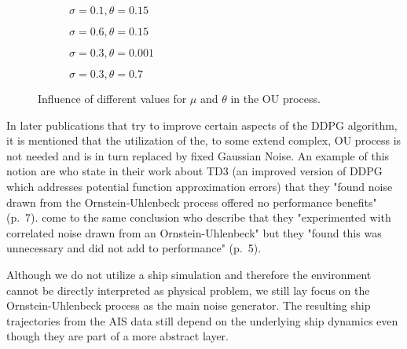 \begin{figure}[H]
    \begin{subfigure}{0.495\textwidth}
      \centering
        
      \caption{$\sigma = 0.1, \theta = 0.15$}
      \label{fig:sub-first}
    \end{subfigure}
    \begin{subfigure}{0.495\textwidth}
      \centering
        
      \caption{$\sigma = 0.6, \theta = 0.15$}
      \label{fig:sub-first}
    \end{subfigure}

\medskip %
    \begin{subfigure}{0.495\textwidth}
      \centering
        
      \caption{$\sigma = 0.3, \theta = 0.001$}
      \label{fig:sub-first}
    \end{subfigure}
    \begin{subfigure}{0.495\textwidth}
      \centering
        
      \caption{$\sigma = 0.3, \theta = 0.7$}
      \label{fig:sub-first}
    \end{subfigure}
\caption{Influence of different values for $\mu$ and $\theta$ in the OU process.}
\label{fig:roc}
\end{figure}

\par
In later publications that try to improve certain aspects of the DDPG algorithm, it is mentioned that the utilization of the, to some extend complex, OU process is not needed and is in turn replaced by fixed Gaussian Noise. An example of this notion are \cite{fujimoto2018addressing} who state in their work about TD3 (an improved version of DDPG which addresses potential function approximation errors) that they "found noise drawn from the Ornstein-Uhlenbeck process offered no performance benefits" (p.~7). \cite{barth2018distributed} come to the same conclusion who describe that they "experimented with correlated noise drawn from an Ornstein-Uhlenbeck" but they "found this was unnecessary and did
not add to performance" (p.~5).
\par
Although we do not utilize a ship simulation and therefore the environment cannot be directly interpreted as physical problem, we still lay focus on the Ornstein-Uhlenbeck process as the main noise generator. The resulting ship trajectories from the AIS data still depend on the underlying ship dynamics even though they are part of a more abstract layer.
